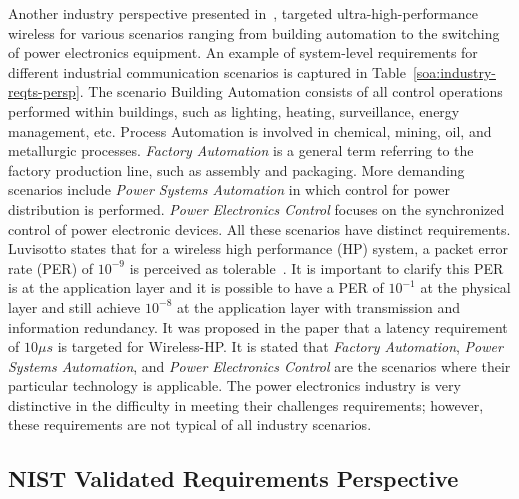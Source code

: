 Another industry perspective presented in~\cite{Luvisotto2017}, targeted ultra-high-performance wireless for various scenarios ranging from building automation to the switching of power electronics equipment. An example of system-level requirements for different industrial communication scenarios is captured in Table~\ref{soa:industry-reqts-persp}. The scenario Building Automation consists of all control operations performed within buildings, such as lighting, heating, surveillance, energy management, etc. Process Automation is involved in chemical, mining, oil, and metallurgic processes. \textit{Factory Automation} is a general term referring to the factory production line, such as assembly and packaging. More demanding scenarios include \textit{Power Systems Automation} in which control for power distribution is performed. \textit{Power Electronics Control} focuses on the synchronized control of power electronic devices. All these scenarios have distinct requirements. Luvisotto states that for a wireless high performance (HP) system, a packet error rate (PER) of $10^{-9}$ is perceived as tolerable~\cite{Luvisotto2017}. It is important to clarify this PER is at the application layer and it is possible to have a PER of $10^{-1}$ at the physical layer and still achieve $10^{-8}$ at the application layer with transmission and information redundancy. It was proposed in the paper that a latency requirement of $10{\mu}s$ is targeted for Wireless-HP. It is stated that \textit{Factory Automation}, \textit{Power Systems Automation}, and \textit{Power Electronics Control} are the scenarios where their particular technology is applicable. The power electronics industry is very distinctive in the difficulty in meeting their challenges requirements; however, these requirements are not typical of all industry scenarios.

\subsection{NIST Validated Requirements Perspective}\label{sec:litreview:nist}

